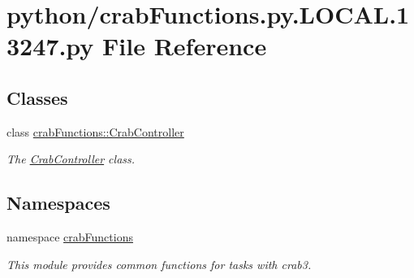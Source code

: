 \section{python/crabFunctions.py.LOCAL.13247.py File Reference}
\label{crabFunctions_8py_8LOCAL_813247_8py}
\subsection*{Classes}
\begin{DoxyCompactItemize}
\item 
class \hyperlink{classcrabFunctions_1_1CrabController}{crabFunctions::CrabController}
\begin{DoxyCompactList}\small\item\em The \hyperlink{classcrabFunctions_1_1CrabController}{CrabController} class. \item\end{DoxyCompactList}\end{DoxyCompactItemize}
\subsection*{Namespaces}
\begin{DoxyCompactItemize}
\item 
namespace \hyperlink{namespacecrabFunctions}{crabFunctions}


\begin{DoxyCompactList}\small\item\em This module provides common functions for tasks with crab3. \item\end{DoxyCompactList}\end{DoxyCompactItemize}
